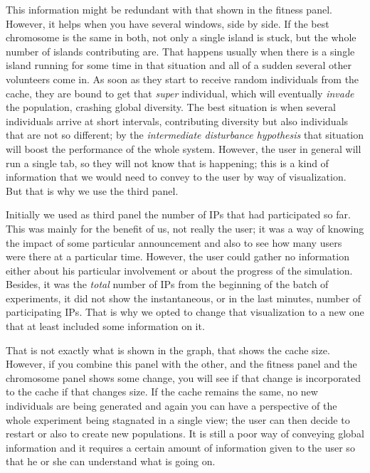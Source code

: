\documentclass{sig-alternate}
\begin{document}
This information might be redundant with that shown in the fitness
panel. However, it helps when you
have several windows, side by side. If the best chromosome is the same
in both, not only a single island is stuck, but the whole number of
islands contributing are. That happens usually when there is a single
island running for some time in that situation and all of a sudden
several other volunteers come in. As soon as they start to receive
random individuals from the cache, they are bound to get that {\em
  super} individual, which will eventually {\em invade} the
population, crashing global diversity. The best situation is when
several individuals arrive at short intervals, contributing diversity
but also individuals that are not so different; by the {\em
  intermediate disturbance hypothesis} that
situation will boost the performance of the whole system. However, the
user in general will run a single tab, so they will not know that is
happening; this is a kind of information that we would need to convey
to the user by way of visualization. But that is why we use the third
panel. 

Initially we used as third panel the number of IPs that had
participated so far. %
This was
mainly for the benefit of us, not really the user; it was a way of
knowing the impact of some particular announcement and also to see how
many users were there at a particular time. However, the user could
gather no information either about his particular involvement or about
the progress of the simulation. Besides, it was the {\em total} number
of IPs from the beginning of the batch of experiments, it did not show
the instantaneous, or in the last minutes, number of participating
IPs. That is why we opted to change that visualization to a new one
that at least included some information on it. 

That is not exactly what is shown in the graph, that
shows the cache size. However, if you combine this panel with the
other, and the fitness panel and the chromosome panel shows some
change, you will see if that change is incorporated to the cache if
that changes size. If the cache remains the same, no new individuals
are being generated and again you can have a perspective of the whole
experiment being stagnated in a single view; the user can then decide
to restart or also to create new populations. It is still a poor way
of conveying global information and it requires a certain amount of
information given to the user so that he or she can understand what is
going on.
\end{document}
